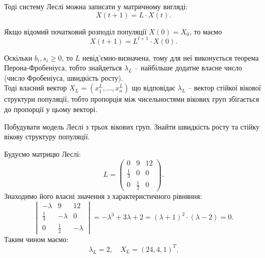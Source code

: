 Тоді систему Леслі можна записати у матричному вигляді:
\begin{equation}
    X(t + 1) = L \cdot X(t).
\end{equation}

Якщо відомий початковий розподіл популяції $X(0) = X_0$, то маємо 
\begin{equation}
    X(t + 1) = L^{t + 1} \cdot X(0).
\end{equation}

Оскільки $b_i, s_i \ge 0$, то $L$ невід'ємно-визначена, тому для неї виконується теорема Перона-Фробеніуса, тобто знайдеться $\lambda_L$ -- найбільше додатне власне число (число Фробеніуса, швидкість росту). \\

Тоді власний вектор $X_L = \left( x_1^L, \ldots, x_n^L \right)$ що відповідає $\lambda_L$ -- вектор стійкої вікової структури популяції, тобто пропорція між чисельностями вікових груп збігається до пропорції у цьому векторі.

\begin{example*}
    Побудувати модель Леслі з трьох вікових груп. Знайти швидкість росту та стійку вікову структуру популяції.
\end{example*}

\begin{solution}
    Будуємо матрицю Леслі:
    \[ L = \begin{pmatrix} 0 & 9 & 12 \\ \frac{1}{3} & 0 & 0 \\ 0 & \frac{1}{2} & 0 \end{pmatrix}. \]
    Знаходимо його власні значення з характеристичного рівняння:
    \[ \begin{vmatrix} - \lambda & 9 & 12 \\ \frac{1}{3} & - \lambda & 0 \\ 0 & \frac{1}{2} & - \lambda \end{vmatrix} = - \lambda^3 + 3 \lambda + 2 = ( \lambda + 1)^2 \cdot (\lambda - 2) = 0. \]
    Таким чином маємо:
    \[ \lambda_L = 2, \quad X_L = \left( 24, 4, 1 \right)^T. \]
\end{solution}



